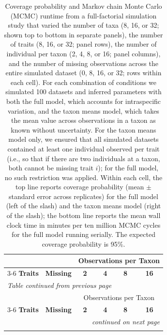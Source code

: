 \clearpage
\begingroup
\scriptsize
\renewcommand{\arraystretch}{1.2}
\setlength{\tabcolsep}{3pt}
\begin{longtable}{cccccc}
\caption{Coverage probability and Markov chain Monte Carlo (MCMC) runtime from a full-factorial simulation study that varied the number of taxa (8, 16, or 32; shown top to bottom in separate panels), the number of traits (8, 16, or 32; panel rows), the number of individual per taxon (2, 4, 8, or 16; panel columns), and the number of missing observations across the entire simulated dataset (0, 8, 16, or 32; rows within each cell). For each combination of conditions we simulated 100 datasets and inferred parameters with both the full model, which accounts for intraspecific variation, and the taxon means model, which takes the mean value across observations in a taxon as known without uncertainty. For the taxon means model only, we ensured that all simulated datasets contained at least one individual observed per trait (i.e., so that if there are two individuals at a taxon, both cannot be missing trait $i$); for the full model, no such restriction was applied. Within each cell, the top line reports coverage probability (mean $\pm$ standard error across replicates) for the full model (left of the slash) and the taxon means model (right of the slash); the bottom line reports the mean wall clock time in minutes per ten million MCMC cycles for the full model running serially. The expected coverage probability is 95\%. } \label{table:coverage} \\
 
\toprule
 & & \multicolumn{4}{c}{Observations per Taxon} \\
\cmidrule(lr){3-6}
\textbf{Traits} & \textbf{Missing} & \textbf{2} & \textbf{4} & \textbf{8} & \textbf{16} \\
\midrule
\endfirsthead
 
\multicolumn{6}{l}{\textit{Table \thetable{} continued from previous page}} \\
\toprule
 & & \multicolumn{4}{c}{Observations per Taxon} \\
\cmidrule(lr){3-6}
\textbf{Traits} & \textbf{Missing} & \textbf{2} & \textbf{4} & \textbf{8} & \textbf{16} \\
\midrule
\endhead
 
\midrule
\multicolumn{6}{r}{\textit{continued on next page}} \\
\endfoot
 
\bottomrule
\endlastfoot


\end{longtable}
